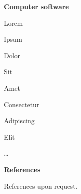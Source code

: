 \documentclass[a4paper,12pt,final]{memoir}
\newcommand{\Sep}{\vspace{1.5em}}
\newcommand{\SmallSep}{\vspace{0.5em}}
\newcommand{\CVSection}[1]
	{\Large\textbf{#1}\par
	\SmallSep\normalsize\normalfont}
\newcommand{\CVItem}[1]
	{\textbf{\color{RoyalBlue} #1}}
\begin{document}
\CVItem{Computer software}
\begin{multicols}{3}
\begin{compactitem}[\color{RoyalBlue}$\circ$]
\item Lorem
\item Ipsum
\item Dolor
\item Sit
\item Amet
\item Consectetur
\item Adipiscing
\item Elit
\item \ldots
\end{compactitem}
\end{multicols}
\Sep

\CVSection{References}
References upon request.

\end{document}
